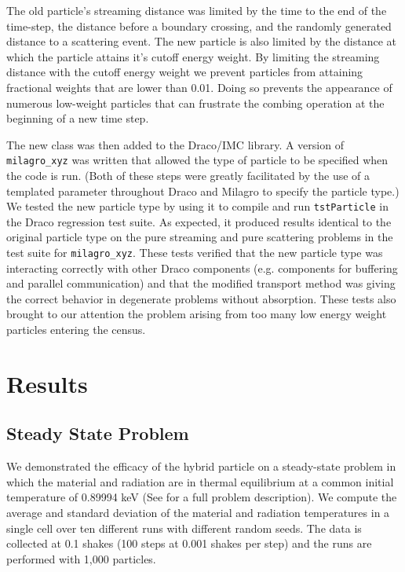 \documentclass[11pt]{nmemo}
\begin{document}
The old particle's streaming distance was limited by the time to the
end of the time-step, the distance before a boundary crossing, and the
randomly generated distance to a scattering event.  The new particle
is also limited by the distance at which the particle attains it's
cutoff energy weight. By limiting the streaming distance with the
cutoff energy weight we prevent particles from attaining fractional
weights that are lower than 0.01. Doing so prevents the appearance of
numerous low-weight particles that can frustrate the combing operation
at the beginning of a new time step.

The new class was then added to the Draco/IMC library. A version of
\texttt{milagro\_xyz} was written that allowed the type of particle to
be specified when the code is run. (Both of these steps were greatly
facilitated by the use of a templated parameter throughout Draco and
Milagro to specify the particle type.) We tested the new particle type
by using it to compile and run \texttt{tstParticle} in the Draco
regression test suite. As expected, it produced results identical to
the original particle type on the pure streaming and pure scattering
problems in the test suite for \texttt{milagro\_xyz}. These tests
verified that the new particle type was interacting correctly with
other Draco components (e.g. components for buffering and parallel
communication) and that the modified transport method was giving the
correct behavior in degenerate problems without absorption. These
tests also brought to our attention the problem arising from too many
low energy weight particles entering the census.

\section{Results}

\subsection{Steady State Problem}

We demonstrated the efficacy of the hybrid particle on a steady-state
problem in which the material and radiation are in thermal equilibrium
at a common initial temperature of 0.89994 keV (See \cite{x-6:rn99037}
for a full problem description). We compute the average and standard
deviation of the material and radiation temperatures in a single cell
over ten different runs with different random seeds. The data is
collected at 0.1 shakes (100 steps at 0.001 shakes per step) and the
runs are performed with 1,000 particles.
\end{document}
